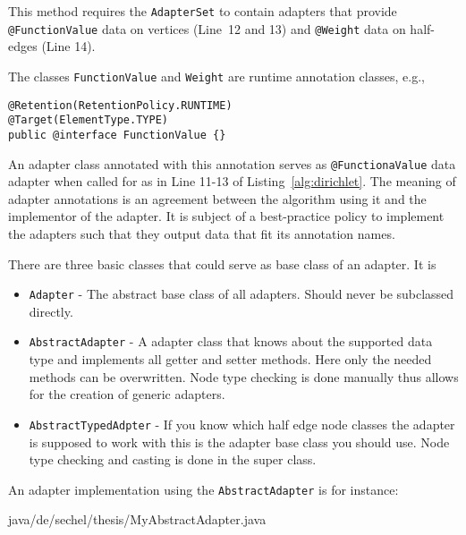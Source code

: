 \documentclass[Thesis.tex]{subfiles}
\begin{document}
This method requires the {\tt AdapterSet} to contain adapters that provide
{\tt @FunctionValue} data on vertices (Line~12 and 13) and {\tt @Weight} data on half-edges (Line 14). 

The classes {\tt FunctionValue} and {\tt Weight} are runtime annotation classes, e.g.,

\begin{lstlisting}
@Retention(RetentionPolicy.RUNTIME)
@Target(ElementType.TYPE)
public @interface FunctionValue {}
\end{lstlisting}

An adapter class annotated with this annotation serves as {\tt @FunctionaValue} data adapter when 
called for as in Line 11-13 of Listing~\ref{alg:dirichlet}. The meaning of adapter annotations is 
an agreement between the algorithm using it and the implementor of the adapter. It is subject
of a best-practice policy to implement the adapters such that they output data that fit its 
annotation names.

There are three basic classes that could serve as base class of an adapter. It is

\begin{itemize}
\item {\tt Adapter} - The abstract base class of all adapters. Should never be subclassed directly.
\item {\tt AbstractAdapter} - A adapter class that knows about the supported data type and implements
all getter and setter methods. Here only the needed methods can be overwritten. Node type checking
is done manually thus allows for the creation of generic adapters.
\item {\tt AbstractTypedAdpter} - If you know which half edge node classes the adapter is supposed to
work with this is the adapter base class you should use. Node type checking and casting is done in the
super class.
\end{itemize}

An adapter implementation using the {\tt AbstractAdapter} is for instance:

 {java/de/sechel/thesis/MyAbstractAdapter.java}
\end{document}
